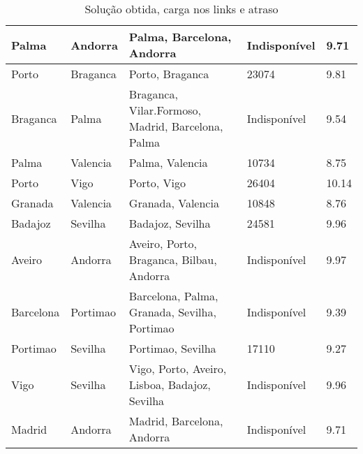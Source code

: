 \begin{table}[!htb]
{\begin{tabular}{|l|l|l|l|l|}
Palma & Andorra & Palma, Barcelona, Andorra & Indisponível & 9.71 \\ \hline
Porto & Braganca & Porto, Braganca & 23074 & 9.81 \\ \hline
Braganca & Palma & Braganca, Vilar.Formoso, Madrid, Barcelona, Palma & Indisponível & 9.54 \\ \hline
Palma & Valencia & Palma, Valencia & 10734 & 8.75 \\ \hline
Porto & Vigo & Porto, Vigo & 26404 & 10.14 \\ \hline
Granada & Valencia & Granada, Valencia & 10848 & 8.76 \\ \hline
Badajoz & Sevilha & Badajoz, Sevilha & 24581 & 9.96 \\ \hline
Aveiro & Andorra & Aveiro, Porto, Braganca, Bilbau, Andorra & Indisponível & 9.97 \\ \hline
Barcelona & Portimao & Barcelona, Palma, Granada, Sevilha, Portimao & Indisponível & 9.39 \\ \hline
Portimao & Sevilha & Portimao, Sevilha & 17110 & 9.27 \\ \hline
Vigo & Sevilha & Vigo, Porto, Aveiro, Lisboa, Badajoz, Sevilha & Indisponível & 9.96 \\ \hline
Madrid & Andorra & Madrid, Barcelona, Andorra & Indisponível & 9.71 \\ \hline
\end{tabular}}
\caption[]{Solução obtida, carga nos links e atraso}
\end{table}

